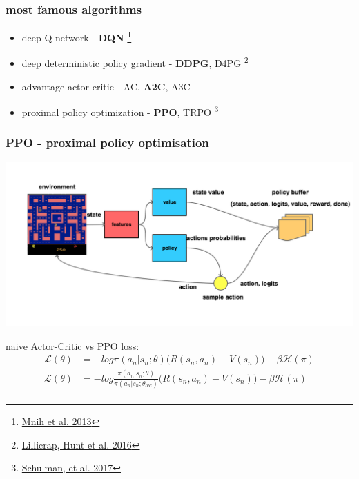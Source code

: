 \documentclass{beamer}
\begin{document}
\begin{frame}
  
  \frametitle{most famous algorithms} 

  \begin{itemize}
    \item deep Q network - {\bf DQN} \footnote{\href{https://arxiv.org/pdf/1312.5602.pdf}{Mnih et al. 2013}}
    \item deep deterministic policy gradient - {\bf DDPG}, D4PG \footnote{\href{https://arxiv.org/pdf/1509.02971.pdf}{Lillicrap, Hunt et al. 2016}}
    \item advantage actor critic - AC, {\bf A2C}, A3C
    \item proximal policy optimization - {\bf PPO}, TRPO \footnote{\href{https://arxiv.org/pdf/1707.06347.pdf}{Schulman, et al. 2017}}
  \end{itemize}

\end{frame}


\begin{frame}
  
  \frametitle{PPO - proximal policy optimisation} 

  \centering
  \includegraphics[scale=0.1]{../diagrams/basic/ppo.png}

  
  naive Actor-Critic vs PPO loss: 
  \begin{align*}
    \mathcal{L(\theta)} &= -log \pi(a_n \vert s_n ; \theta) \Big( R(s_n, a_n) - V(s_n) \Big) - \beta\mathcal{H(\pi)} \\
    \mathcal{L(\theta)} &= -log \frac{\pi(a_n \vert s_n ; \theta)}{\pi(a_n \vert s_n ; \theta_{old})} \Big( R(s_n, a_n) - V(s_n) \Big) - \beta\mathcal{H(\pi)} \\
  \end{align*} 

\end{frame}
\end{document}
